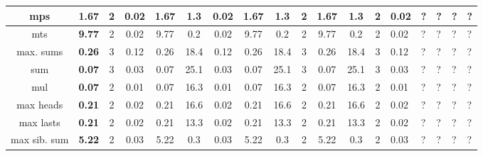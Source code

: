 \begin{table}
{\begin{tabular}[h]{|c| c|c|c|| c|c|c || c|c|c|| c|c|c|}
			mps                        & {\bf 1.67}                  & 2                                         & 0.02                                       & 1.67                                     & 1.3  & 0.02       & 1.67   & 1.3  & 2          & 1.67   & 1.3  & 2 & 0.02  & ? & ? & ? & ? \\
			\hline
			mts                        & {\bf 9.77}                  & 2                                         & 0.02                                       & 9.77                                     & 0.2  & 0.02       & 9.77   & 0.2  & 2          & 9.77   & 0.2  & 2 & 0.02  & ? & ? & ? & ? \\
			max. sums                  & {\bf 0.26}                  & 3                                         & 0.12                                       & 0.26                                     & 18.4 & 0.12       & 0.26   & 18.4 & 3          & 0.26   & 18.4 & 3 & 0.12  & ? & ? & ? & ? \\
			\hline
			sum                        & {\bf 0.07}                  & 3                                         & 0.03                                       & 0.07                                     & 25.1 & 0.03       & 0.07   & 25.1 & 3          & 0.07   & 25.1 & 3 & 0.03  & ? & ? & ? & ? \\
			mul                        & {\bf 0.07}                  & 2                                         & 0.01                                       & 0.07                                     & 16.3 & 0.01       & 0.07   & 16.3 & 2          & 0.07   & 16.3 & 2 & 0.01  & ? & ? & ? & ? \\
			max heads                  & {\bf 0.21}                  & 2                                         & 0.02                                       & 0.21                                     & 16.6 & 0.02       & 0.21   & 16.6 & 2          & 0.21   & 16.6 & 2 & 0.02  & ? & ? & ? & ? \\
			max lasts                  & {\bf 0.21}                  & 2                                         & 0.02                                       & 0.21                                     & 13.3 & 0.02       & 0.21   & 13.3 & 2          & 0.21   & 13.3 & 2 & 0.02  & ? & ? & ? & ? \\
			max sib. sum               & {\bf 5.22}                  & 2                                         & 0.03                                       & 5.22                                     & 0.3  & 0.03       & 5.22   & 0.3  & 2          & 5.22   & 0.3  & 2 & 0.03  & ? & ? & ? & ? \\

\end{tabular}}
\end{table}
